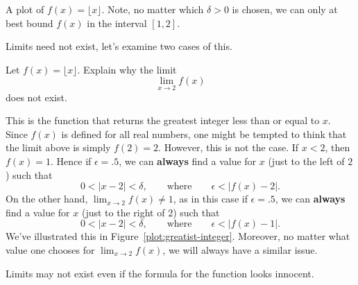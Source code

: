 \begin{marginfigure}[0in]
\caption{A plot of $f(x)=\lfloor x\rfloor$. Note, no matter which
  $\delta>0$ is chosen, we can only at best bound $f(x)$ in the
  interval $[1,2]$.}
\label{plot:greatist-integer}
\end{marginfigure}

Limits need not exist, let's examine two cases of this.

\begin{example}
Let $f(x) = \lfloor x\rfloor$. Explain why the limit
\[
\lim_{x\to 2} f(x)
\]
does not exist.
\end{example}
\begin{solution}
This is the function that returns the greatest integer less than or
equal to $x$. Since $f(x)$ is defined for all real numbers, one might
be tempted to think that the limit above is simply $f(2) =
2$. However, this is not the case.  If $x<2$, then $f(x) =1$. Hence if
$\epsilon = .5$, we can \textbf{always} find a value for $x$ (just to
the left of $2$) such that
\[
0< |x -2|< \delta, \qquad\text{where} \qquad \epsilon < |f(x)-2|.
\]
On the other hand, $\lim_{x\to 2} f(x)\ne 1$, as in this case if
$\epsilon=.5$, we can \textbf{always} find a value for $x$ (just to
the right of $2$) such that
\[
0<|x- 2|<\delta, \qquad\text{where} \qquad  \epsilon<|f(x)-1|.
\]
We've illustrated this in
Figure~\ref{plot:greatist-integer}. Moreover, no matter what value one
chooses for $\lim_{x\to 2} f(x)$, we will always have a similar
issue.
\end{solution}



Limits may not exist even if the formula for the function looks
innocent.


